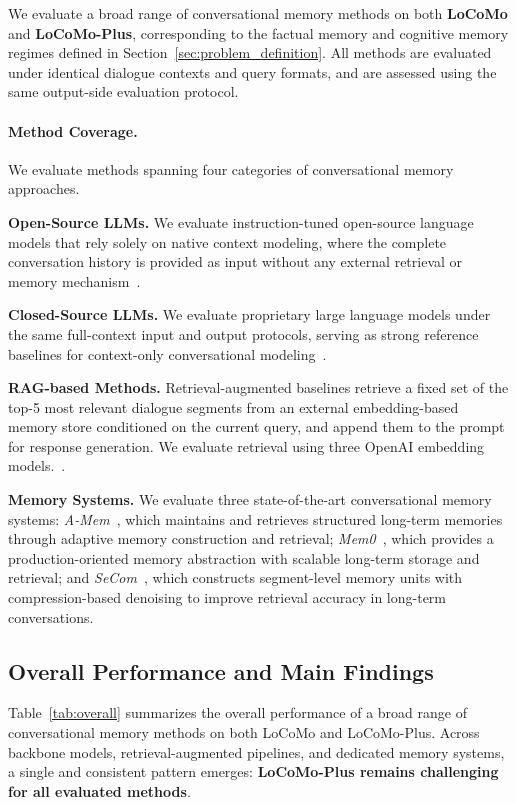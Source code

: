 \documentclass[11pt]{article}
\begin{document}
We evaluate a broad range of conversational memory methods on both
\textbf{LoCoMo} and \textbf{LoCoMo-Plus}, corresponding to the
factual memory and cognitive memory
regimes defined in Section~\ref{sec:problem_definition}.
All methods are evaluated under identical dialogue contexts and query
formats, and are assessed using the same output-side evaluation
protocol.


\paragraph{Method Coverage.}
We evaluate methods spanning four categories of conversational memory
approaches.

\textbf{Open-Source LLMs.}
We evaluate instruction-tuned open-source language models that rely solely on
native context modeling, where the complete conversation history is provided
as input without any external retrieval or memory mechanism~\cite{team2024qwen2,yang2025qwen3}.

\textbf{Closed-Source LLMs.}
We evaluate proprietary large language models under the same full-context
input and output protocols, serving as strong reference baselines for
context-only conversational modeling~\cite{achiam2023gpt,team2023gemini}.

\textbf{RAG-based Methods.}
Retrieval-augmented baselines retrieve a fixed set of the top-5 most relevant
dialogue segments from an external embedding-based memory store conditioned on
the current query, and append them to the prompt for response generation.
We evaluate retrieval using three OpenAI embedding models.~\cite{openai_embeddings}.

\textbf{Memory Systems.}
We evaluate three state-of-the-art conversational memory systems:
\emph{A-Mem}~\cite{xu2025mem}, which maintains and retrieves structured
long-term memories through adaptive memory construction and retrieval;
\emph{Mem0}~\cite{chhikara2025mem0}, which provides a production-oriented
memory abstraction with scalable long-term storage and retrieval; and
\emph{SeCom}~\cite{pan2025memory}, which constructs segment-level memory units
with compression-based denoising to improve retrieval accuracy in long-term
conversations.

\subsection{Overall Performance and Main Findings}

Table~\ref{tab:overall} summarizes the overall performance of a broad
range of conversational memory methods on both LoCoMo and LoCoMo-Plus.
Across backbone models, retrieval-augmented pipelines, and dedicated
memory systems, a single and consistent pattern emerges:
\textbf{LoCoMo-Plus remains challenging for all evaluated methods}.
\end{document}
